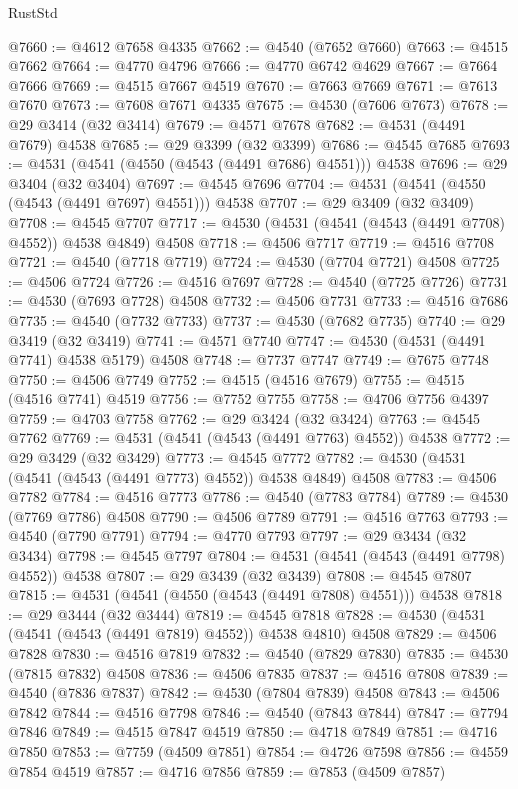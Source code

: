 \begin{lexlean}{RustStd}
\begin{coremodule}
{\begin{coremodule}
{{{{{{{{{{{{{{{{{{{{{{{{{{{{{{{{{{{{{{{{{{{{{{{{{{{{{{{@7660 := @4612 @7658 @4335
@7662 := @4540 (@7652 @7660)
@7663 := @4515 @7662
@7664 := @4770 @4796
@7666 := @4770 @6742 @4629
@7667 := @7664 @7666
@7669 := @4515 @7667 @4519
@7670 := @7663 @7669
@7671 := @7613 @7670
@7673 := @7608 @7671 @4335
@7675 := @4530 (@7606 @7673)
@7678 := @29 @3414 (@32 @3414)
@7679 := @4571 @7678
@7682 := @4531 (@4491 @7679) @4538
@7685 := @29 @3399 (@32 @3399)
@7686 := @4545 @7685
@7693 := @4531 (@4541 (@4550 (@4543 (@4491 @7686) @4551))) @4538
@7696 := @29 @3404 (@32 @3404)
@7697 := @4545 @7696
@7704 := @4531 (@4541 (@4550 (@4543 (@4491 @7697) @4551))) @4538
@7707 := @29 @3409 (@32 @3409)
@7708 := @4545 @7707
@7717 := @4530 (@4531 (@4541 (@4543 (@4491 @7708) @4552)) @4538 @4849) @4508
@7718 := @4506 @7717
@7719 := @4516 @7708
@7721 := @4540 (@7718 @7719)
@7724 := @4530 (@7704 @7721) @4508
@7725 := @4506 @7724
@7726 := @4516 @7697
@7728 := @4540 (@7725 @7726)
@7731 := @4530 (@7693 @7728) @4508
@7732 := @4506 @7731
@7733 := @4516 @7686
@7735 := @4540 (@7732 @7733)
@7737 := @4530 (@7682 @7735)
@7740 := @29 @3419 (@32 @3419)
@7741 := @4571 @7740
@7747 := @4530 (@4531 (@4491 @7741) @4538 @5179) @4508
@7748 := @7737 @7747
@7749 := @7675 @7748
@7750 := @4506 @7749
@7752 := @4515 (@4516 @7679)
@7755 := @4515 (@4516 @7741) @4519
@7756 := @7752 @7755
@7758 := @4706 @7756 @4397
@7759 := @4703 @7758
@7762 := @29 @3424 (@32 @3424)
@7763 := @4545 @7762
@7769 := @4531 (@4541 (@4543 (@4491 @7763) @4552)) @4538
@7772 := @29 @3429 (@32 @3429)
@7773 := @4545 @7772
@7782 := @4530 (@4531 (@4541 (@4543 (@4491 @7773) @4552)) @4538 @4849) @4508
@7783 := @4506 @7782
@7784 := @4516 @7773
@7786 := @4540 (@7783 @7784)
@7789 := @4530 (@7769 @7786) @4508
@7790 := @4506 @7789
@7791 := @4516 @7763
@7793 := @4540 (@7790 @7791)
@7794 := @4770 @7793
@7797 := @29 @3434 (@32 @3434)
@7798 := @4545 @7797
@7804 := @4531 (@4541 (@4543 (@4491 @7798) @4552)) @4538
@7807 := @29 @3439 (@32 @3439)
@7808 := @4545 @7807
@7815 := @4531 (@4541 (@4550 (@4543 (@4491 @7808) @4551))) @4538
@7818 := @29 @3444 (@32 @3444)
@7819 := @4545 @7818
@7828 := @4530 (@4531 (@4541 (@4543 (@4491 @7819) @4552)) @4538 @4810) @4508
@7829 := @4506 @7828
@7830 := @4516 @7819
@7832 := @4540 (@7829 @7830)
@7835 := @4530 (@7815 @7832) @4508
@7836 := @4506 @7835
@7837 := @4516 @7808
@7839 := @4540 (@7836 @7837)
@7842 := @4530 (@7804 @7839) @4508
@7843 := @4506 @7842
@7844 := @4516 @7798
@7846 := @4540 (@7843 @7844)
@7847 := @7794 @7846
@7849 := @4515 @7847 @4519
@7850 := @4718 @7849
@7851 := @4716 @7850
@7853 := @7759 (@4509 @7851)
@7854 := @4726 @7598
@7856 := @4559 @7854 @4519
@7857 := @4716 @7856
@7859 := @7853 (@4509 @7857)
}}}}}}}}}}}}}}}}}}}}}}}}}}}}}}}}}}}}}}}}}}}}}}}}}}}}}}}
\end{coremodule}}
\end{coremodule}
\end{lexlean}
